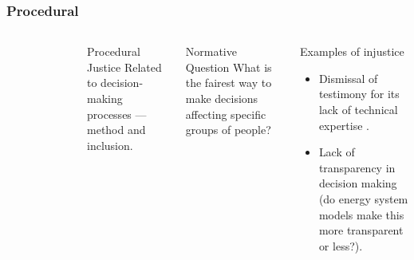 \begin{frame}
    \frametitle{Procedural}
    \begin{columns}
        \column[t]{3cm}
        \begin{figure}
            \centering
        \end{figure}
        \column[t]{7cm}
        \begin{block}{Procedural Justice}
            Related to decision-making processes --- method and inclusion.
        \end{block}
        \begin{block}{Normative Question}
            What is the fairest way to make decisions affecting specific groups of people?
        \end{block}
        \begin{block}{Examples of injustice}
            \begin{itemize}
                \item Dismissal of testimony for its lack of technical expertise \cite{johnson_dakota_2021}. 
                \item Lack of transparency in decision making (do energy system models make this more transparent or less?).
            \end{itemize}
        \end{block}
    \end{columns}
    
\end{frame}

